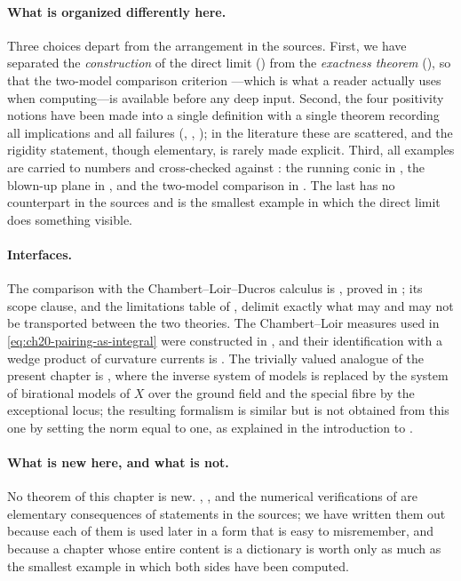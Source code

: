 \paragraph{What is organized differently here.}
Three choices depart from the arrangement in the sources.  First, we have
separated the \emph{construction} of the direct limit
() from the \emph{exactness
theorem} (), so that the two-model comparison
criterion ---which is what a reader
actually uses when computing---is available before any deep input.  Second,
the four positivity notions have been made into a single definition with a
single theorem recording all implications and all failures
(,
,
); in the literature these are
scattered, and the rigidity statement, though elementary, is rarely made
explicit.  Third, all examples are carried to numbers and cross-checked
against : the running conic in
, the blown-up plane in
, and the two-model
comparison in .  The last has no counterpart
in the sources and is the smallest example in which the direct limit does
something visible.

\paragraph{Interfaces.}
The comparison with the Chambert--Loir--Ducros calculus is
, proved in
; its scope clause, and the limitations table of
, delimit exactly what may and may not be
transported between the two theories.  The Chambert--Loir measures used in
\eqref{eq:ch20-pairing-as-integral} were constructed in
, and their identification with a wedge product
of curvature currents is
.  The trivially valued analogue of the present
chapter is , where the inverse system of models is
replaced by the system of birational models of \(X\) over the ground field
and the special fibre by the exceptional locus; the resulting formalism is
similar but is not obtained from this one by setting the norm equal to one,
as explained in the introduction to .

\paragraph{What is new here, and what is not.}
No theorem of this chapter is new.  ,
,  and the
numerical verifications of  are elementary
consequences of statements in the sources; we have written them out because
each of them is used later in a form that is easy to misremember, and
because a chapter whose entire content is a dictionary is worth only as much
as the smallest example in which both sides have been computed.
